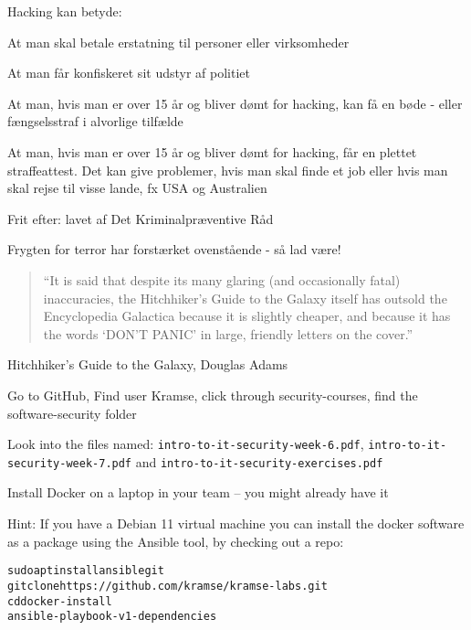 \documentclass[Screen16to9,17pt]{foils}
\begin{document}
Hacking kan betyde:
\begin{list2}
\item At man skal betale erstatning til personer eller virksomheder
\item At man får konfiskeret sit udstyr af politiet
\item At man, hvis man er over 15 år og bliver dømt for hacking, kan
  få en bøde - eller fængselsstraf i alvorlige tilfælde
\item At man, hvis man er over 15 år og bliver dømt for hacking, får
en plettet straffeattest. Det kan give problemer, hvis man skal finde
et job eller hvis man skal rejse til visse lande, fx USA og
Australien
\item Frit efter:  lavet af Det
  Kriminalpræventive Råd
\item Frygten for terror har forstærket ovenstående - så lad være!
\end{list2}




\begin{quote}
“It is said that despite its many glaring (and occasionally fatal) inaccuracies, the Hitchhiker’s Guide to the Galaxy itself has outsold the Encyclopedia Galactica because it is slightly cheaper, and because it has the words ‘DON’T PANIC’ in large, friendly letters on the cover.”
\end{quote}
Hitchhiker’s Guide to the Galaxy, Douglas Adams


\begin{list2}
\item Go to GitHub, Find user Kramse, click through security-courses, find the software-security folder\\
\item Look into the files named: \verb+intro-to-it-security-week-6.pdf+, \verb+intro-to-it-security-week-7.pdf+ and \verb+intro-to-it-security-exercises.pdf+
\item Install Docker on a laptop in your team -- you might already have it
\end{list2}

Hint: If you have a Debian 11 virtual machine you can install the docker software as a package using the Ansible tool, by checking out a repo:
\begin{alltt}
sudo apt install ansible git
git clone https://github.com/kramse/kramse-labs.git
cd docker-install
ansible-playbook -v 1-dependencies
\end{alltt}





\end{document}
